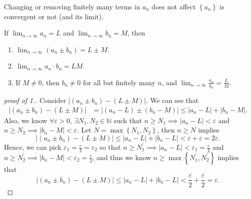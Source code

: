 \begin{remark}
	Changing or removing finitely many terms in \(a_n\) does not affect \(\left\{ a_n \right\} \) is convergent or not (and its limit).   
\end{remark}

\begin{proposition}
	If \(\lim_{n \to \infty} a_n = L\) and \(\lim_{n \to \infty} b_n = M \), then
	\begin{enumerate}
		\item \(\lim_{n \to \infty} (a_n \pm b_n) = L \pm M\). 
		\item \(\lim_{n \to \infty} a_n \cdot b_n = LM \). 
		\item If \(M \neq 0\), then \(b_n \neq 0\) for all but finitely many \(n\), and \(\lim_{n \to \infty} \frac{a_n}{b_n} = \frac{L}{M} \).       
	\end{enumerate}  
\end{proposition}
\begin{proof}[proof of 1.]
	Consider \(\left\vert (a_n \pm b_n) - (L \pm M) \right\vert \). We can see that 
	\begin{align*}
		\left\vert (a_n \pm b_n) - (L \pm M) \right\vert &= \left\vert (a_n - L) \pm (b_n - M) \right\vert \le \left\vert a_n - L \right\vert + \left\vert b_n - M \right\vert   .
	\end{align*}
	Also, we know \(\forall \varepsilon > 0, \ \exists N_1, N_2 \in \mathbb{N} \) such that \(n \ge N_1 \implies \vert a_n - L \vert < \varepsilon  \) and \(n \ge N_2 \implies \vert b_n - M \vert < \varepsilon  \). Let \(N = \max \left\{ N_1, N_2 \right\} \), then \(n \ge N\) implies 
	\[
		\left\vert (a_n \pm b_n) - (L \pm M) \right\vert \le \left\vert a_n - L \right\vert + \left\vert b_n - L \right\vert < \varepsilon + \varepsilon  = 2\varepsilon .   
	\]     
	Hence, we can pick \(\varepsilon_1 = \frac{\varepsilon}{2} = \varepsilon _2\) so that \(n \ge N_1^{\prime} \implies \vert a_n - L \vert < \varepsilon _1 = \frac{\varepsilon}{2} \) and \(n \ge N_2^{\prime} \implies \vert b_n - M \vert < \varepsilon _2 = \frac{\varepsilon}{2} \), and thus we know \(n \ge \max \left\{ N_1^{\prime} , N_2^{\prime}  \right\} \) implies that 
		\[
		\left\vert (a_n \pm b_n) - (L \pm M) \right\vert \le \left\vert a_n - L \right\vert + \left\vert b_n - L \right\vert < \frac{\varepsilon}{2} + \frac{\varepsilon}{2}  = \varepsilon .   
	\]      
\end{proof}
